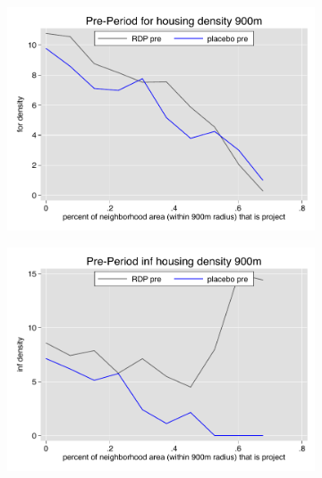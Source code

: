 \documentclass[12pt]{article}
\begin{document}
\begin{figure}
        \begin{subfigure}[b]{0.495\textwidth}
            \centering
            \includegraphics[width=\textwidth,trim={0.3cm .3cm 0.1cm 0cm}, clip=true]{figures/overlap_for_900_local_pre.pdf}
        \end{subfigure}
        \hfill
        \begin{subfigure}[b]{0.495\textwidth}  
            \centering 
            \includegraphics[width=\textwidth,trim={0.3cm .3cm 0.1cm 0cm}, clip=true]{figures/overlap_inf_900_local_pre.pdf}
        \end{subfigure}
        \vspace{-6mm}

\end{figure}
\end{document}
